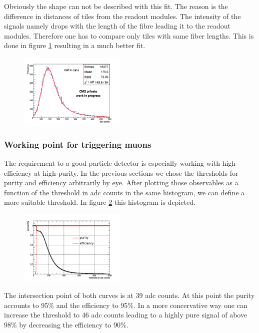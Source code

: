 			Obviously the shape can not be described with this fit.
			The reason is the difference in distances of tiles from the readout modules.
			The intensity of the signals namely drops with the length of the fibre leading it to the readout modules.
			Therefore one has to compare only tiles with same fiber lengths.
			This is done in figure \ref{fig:langaus_good} resulting in a much better fit.
			\begin{figure}[htbp]
				\centering
				\includegraphics[width=0.45\textwidth]{Figures/erdogan/langaus_good.png}
				\caption{}
				\label{fig:langaus_good}
			\end{figure}
		\subsubsection{Working point for triggering muons}
		\label{working_point}
			The requirement to a good particle detector is especially working with high efficiency at high purity.
			In the previous sections we chose the thresholds for purity and efficiency arbitrarily by eye.
			After plotting those observables as a function of the threshold in adc counts in the same histogram, we can define a more suitable threshold.
			In figure \ref{fig:pur_eff} this histogram is depicted.
			\begin{figure}[htbp]
				\centering
				\includegraphics[width=0.45\textwidth]{Figures/erdogan/pur_eff.png}
				\caption{}
				\label{fig:pur_eff}
			\end{figure}
			The intersection point of both curves is at 39 adc counts.
			At this point the purity accounts to 95\% and the efficiency to 95\%.
			In a more concervative way one can increase the threshold to 46 adc counts leading to a highly pure signal of above 98\% by decreasing the efficiency to 90\%.